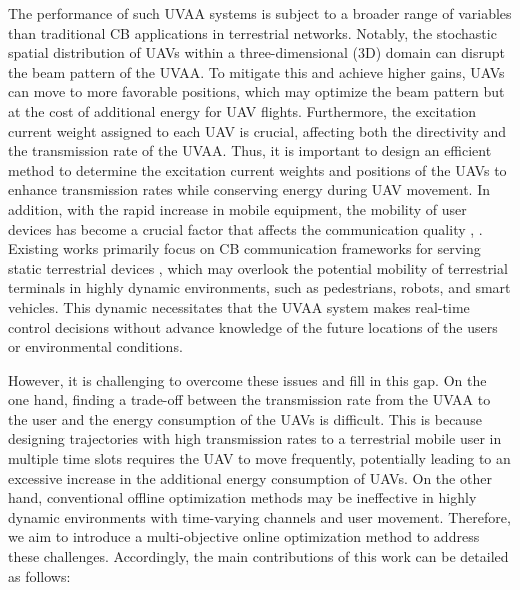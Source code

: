 \documentclass[10pt,journal,compsoc]{IEEEtran}
\begin{document}
\par The performance of such UVAA systems is subject to a broader range of variables than traditional CB applications in terrestrial networks. Notably, the stochastic spatial distribution of UAVs within a three-dimensional (3D) domain can disrupt the beam pattern of the UVAA. To mitigate this and achieve higher gains, UAVs can move to more favorable positions, which may optimize the beam pattern but at the cost of additional energy for UAV flights. Furthermore, the excitation current weight assigned to each UAV is crucial, affecting both the directivity and the transmission rate of the UVAA. Thus, it is important to design an efficient method to determine the excitation current weights and positions of the UAVs to enhance transmission rates while conserving energy during UAV movement. In addition, with the rapid increase in mobile equipment, the mobility of user devices has become a crucial factor that affects the communication quality \cite{Nikooroo2022optimal}, \cite{Yoon2020rendezvous, Sun2023, 10607924}. Existing works primarily focus on CB communication frameworks for serving static terrestrial devices \cite{Li2023multi-objective, Zhang2024, Sun2024, sun2022secure, Xu2023}, which may overlook the potential mobility of terrestrial terminals in highly dynamic environments, such as pedestrians, robots, and smart vehicles. This dynamic necessitates that the UVAA system makes real-time control decisions without advance knowledge of the future locations of the users or environmental conditions. 

\par However, it is challenging to overcome these issues and fill in this gap. On the one hand, finding a trade-off between the transmission rate from the UVAA to the user and the energy consumption of the UAVs is difficult. This is because designing trajectories with high transmission rates to a terrestrial mobile user in multiple time slots requires the UAV to move frequently, potentially leading to an excessive increase in the additional energy consumption of UAVs. On the other hand, conventional offline optimization methods may be ineffective in highly dynamic environments with time-varying channels and user movement. Therefore, we aim to introduce a multi-objective online optimization method to address these challenges. Accordingly, the main contributions of this work can be detailed as follows:
\end{document}
